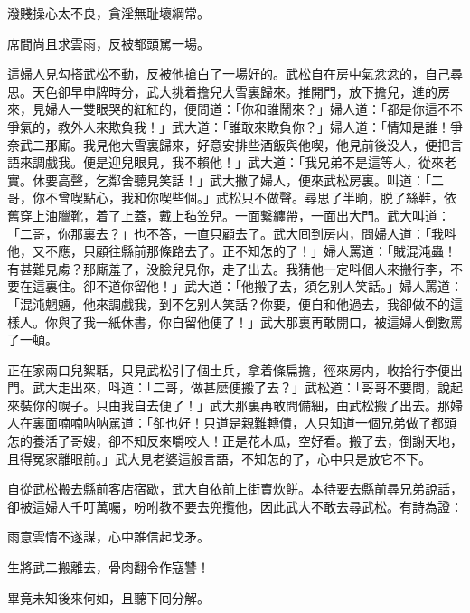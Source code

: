 \begin{myquote}
潑賤操心太不良，貪淫無耻壞綱常。

席間尚且求雲雨，反被都頭駡一場。
\end{myquote}

這婦人見勾搭武松不動，反被他搶白了一場好的。武松自在房中氣忿忿的，自己尋思。天色卻早申牌時分，武大挑着擔兒大雪裏歸來。推開門，放下擔兒，進的房來，見婦人一雙眼哭的紅紅的，便問道：「你和誰鬧來？」婦人道：「都是你這不不爭氣的，教外人來欺負我！」武大道：「誰敢來欺負你？」婦人道：「情知是誰！爭奈武二那廝。我見他大雪裏歸來，好意安排些酒飯與他喫，他見前後没人，便把言語來調戲我。便是迎兒眼見，我不賴他！」武大道：「我兄弟不是這等人，從來老實。休要高聲，乞鄰舍聽見笑話！」武大撇了婦人，便來武松房裏。叫道：「二哥，你不曾喫點心，我和你喫些個。」武松只不做聲。尋思了半晌，脱了絲鞋，依舊穿上油臘靴，着了上蓋，戴上毡笠兒。一面繋纏帶，一面出大門。武大叫道：「二哥，你那裏去？」也不答，一直只顧去了。武大囘到房内，問婦人道：「我呌他，又不應，只顧往縣前那條路去了。正不知怎的了！」婦人罵道：「賊混沌蟲！有甚難見䖏？那廝羞了，没臉兒見你，走了出去。我猜他一定呌個人來搬行李，不要在這裏住。卻不道你留他！」武大道：「他搬了去，須乞别人笑話。」婦人罵道：「混沌魍魎，他來調戲我，到不乞别人笑話？你要，便自和他過去，我卻做不的這樣人。你與了我一紙休書，你自留他便了！」武大那裏再敢開口，被這婦人倒數罵了一頓。

正在家兩口兒絮聒，只見武松引了個土兵，拿着條扁擔，徑來房内，收拾行李便出門。武大走出來，呌道：「二哥，做甚麽便搬了去？」武松道：「哥哥不要問，說起來裝你的幌子。只由我自去便了！」武大那裏再敢問備細，由武松搬了出去。那婦人在裏面喃喃呐呐駡道：「卻也好！只道是親難轉債，人只知道一個兄弟做了都頭怎的養活了哥嫂，卻不知反來嚼咬人！正是花木瓜，空好看。搬了去，倒謝天地，且得冤家離眼前。」武大見老婆這般言語，不知怎的了，心中只是放它不下。

自從武松搬去縣前客店宿歇，武大自依前上街賣炊餅。本待要去縣前尋兄弟說話，卻被這婦人千叮萬囑，吩咐教不要去兜攬他，因此武大不敢去尋武松。有詩為證：

\begin{myquote}
雨意雲情不遂謀，心中誰信起戈矛。

生將武二搬離去，骨肉翻令作寇讐！
\end{myquote}

畢竟未知後來何如，且聽下囘分解。

